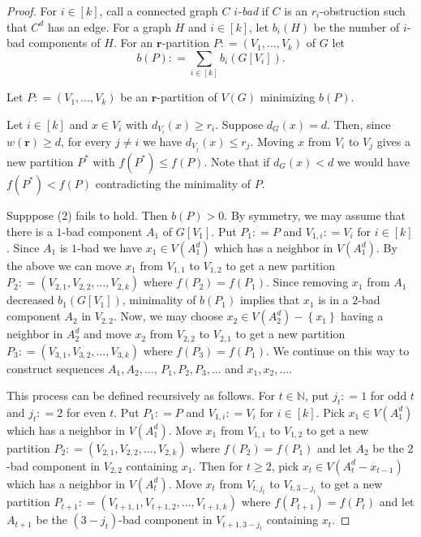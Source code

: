 \documentclass[12pt]{amsart}
\theoremstyle{plain}
\theoremstyle{definition}
\theoremstyle{remark}
\newcommand{\IN}{\mathbb{N}}
\newcommand{\set}[1]{\left\{ #1 \right\}}
\newcommand{\irange}[1]{\left[#1\right]}
\newcommand{\parens}[1]{\left( #1 \right)}
\newcommand{\DefinedAs}{\mathrel{\mathop:}=}
\newcommand{\mov}[2]{#1^{#2}}
\newcommand{\wt}[1]{w\parens{#1}}
\renewcommand{\vec}[1]{\mathbf{#1}}
\begin{document}
\begin{proof}
         For $i \in \irange{k}$, call a connected graph $C$
			\emph{$i$-bad} if $C$ is an $r_i$-obstruction such that $\mov{C}{d}$ has an edge. 
         For a graph $H$ and $i
			\in \irange{k}$, let $b_i(H)$ be the number of $i$-bad components of $H$.
			For an $\vec{r}$-partition $P \DefinedAs \parens{V_1, \ldots, V_k}$ of $G$ let
			\[b(P) \DefinedAs \sum_{i \in \irange{k}} b_i(G[V_i]).\]
			
			\noindent Let $P \DefinedAs \parens{V_1, \ldots, V_k}$ be an $\vec{r}$-partition of
			$V(G)$ minimizing $b(P)$.

			Let $i \in \irange{k}$ and $x \in V_i$ with $d_{V_i}(x) \geq r_i$.  Suppose $d_G(x) = d$.
			Then, since $\wt{\vec{r}} \geq d$, for every $j \neq i$ we have $d_{V_j}(x) \leq
			r_j$. Moving $x$ from $V_i$ to $V_j$ gives a new partition $P^*$ with $f(P^*)
			\leq f(P)$. Note that if $d_{G}(x) < d$ we would have $f(P^*) < f(P)$
			contradicting the minimality of $P$.

			Supppose (2) fails to hold.  Then $b(P) > 0$.  By symmetry, we may assume that there is a
			$1$-bad component $A_1$ of $G[V_{1}]$. Put $P_1 \DefinedAs P$ and $V_{1,i}
			\DefinedAs V_i$ for $i \in \irange{k}$. Since $A_1$ is $1$-bad we have $x_1
			\in V(\mov{A_1}{d})$ which has a neighbor in $V(\mov{A_1}{d})$. By the above we
			can move $x_1$ from $V_{1, 1}$ to $V_{1, 2}$ to get a new partition $P_2
			\DefinedAs \parens{V_{2, 1}, V_{2,2}, \ldots, V_{2,k}}$ where $f(P_2) = f(P_1)$.  
         Since removing $x_1$ from $A_1$ decreased $b_{1}(G[V_{1}])$, minimality of
			$b(P_1)$ implies that $x_1$ is in a $2$-bad component $A_2$ in $V_{2,2}$.			
			Now, we may choose $x_2 \in
			V(\mov{A_2}{d}) - \set{x_1}$ having a neighbor in $\mov{A_2}{d}$ and move
			$x_2$ from $V_{2, 2}$ to $V_{2, 1}$ to get a new partition $P_3
			\DefinedAs \parens{V_{3, 1}, V_{3,2}, \ldots, V_{3,k}}$ where $f(P_3) =
			f(P_1)$.  We continue on this way to construct sequences $A_1, A_2, \ldots$, $P_1, P_2, P_3, \ldots$ and $x_1, x_2, \ldots$.
						
			This process can be defined recursively as follows. For $t \in \IN$, put $j_t \DefinedAs 1$ for odd $t$ and $j_t \DefinedAs 2$ for even $t$. Put $P_1 \DefinedAs P$ and $V_{1,i} \DefinedAs V_i$ for $i \in \irange{k}$. Pick $x_1	\in V(\mov{A_1}{d})$ which has a neighbor in $V(\mov{A_1}{d})$. Move $x_1$ from $V_{1, 1}$ to $V_{1, 2}$ to get a new partition $P_2 \DefinedAs \parens{V_{2, 1}, V_{2,2}, \ldots, V_{2,k}}$ where $f(P_2) = f(P_1)$ and let $A_2$ be the $2$-bad component in $V_{2,2}$ containing $x_1$. Then for $t \geq 2$, pick $x_t \in V(\mov{A_t}{d} - x_{t-1})$ which has a neighbor in $V(\mov{A_t}{d})$. Move $x_t$ from $V_{t, j_t}$ to $V_{t, 3-j_t}$ to get a new partition $P_{t+1} \DefinedAs \parens{V_{t+1, 1}, V_{t+1,2}, \ldots, V_{t+1,k}}$ where $f(P_{t+1}) = f(P_t)$ and let $A_{t+1}$ be the $(3-j_t)$-bad component in $V_{t+1,3-j_t}$ containing $x_t$.


\end{proof}
\end{document}
